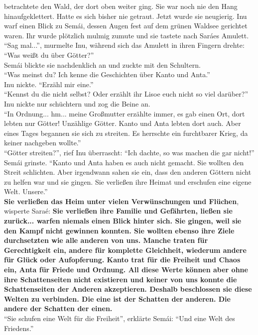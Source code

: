 \documentclass[a4paper,12pt]{book}
\begin{document}
betrachtete den Wald, der dort oben weiter ging. Sie war noch nie den Hang hinaufgeklettert. Hatte 
es sich bisher nie getraut. Jetzt wurde sie neugierig. Inu warf einen Blick zu Semái, dessen Augen 
fest auf dem grünen Waldsee gerichtet waren. 
Ihr wurde plötzlich mulmig zumute und sie tastete nach Saráes Amulett. \\
``Sag mal...'', murmelte Inu, während sich das Amulett in ihren Fingern drehte: ``Was weißt du über 
Götter?''\\
Semái blickte sie nachdenklich an und zuckte mit den Schultern. \\
``Was meinst du? Ich kenne die Geschichten über Kanto und Anta.''\\
Inu nickte. ``Erzähl mir eine.''\\
``Kennst du die nicht selbst?  Oder erzählt ihr Lisoe euch nicht so viel darüber?''\\
Inu nickte nur schüchtern und zog die Beine an. \\
``In Ordnung... hm... meine Großmutter erzählte immer, es gab einen Ort, dort lebten nur Götter! 
Unzählige Götter. Kanto und Anta lebten dort auch. Aber eines Tages begannen sie sich zu streiten. 
Es herrschte ein furchtbarer Krieg, da keiner nachgeben wollte.''\\
``Götter streiten?'', rief Inu überrascht: ``Ich dachte, so was machen die gar nicht!''\\
Semái grinste. ``Kanto und Anta haben es auch nicht gemacht. Sie wollten den Streit schlichten. 
Aber irgendwann sahen sie ein, dass den anderen Göttern nicht zu helfen war und sie gingen. Sie 
verließen ihre Heimat und erschufen eine eigene Welt. Unsere.''\\
\textbf{Sie verließen das Heim unter vielen Verwünschungen und Flüchen}, wisperte Saraé: 
\textbf{Sie verließen ihre Familie und Gefährten, ließen sie zurück... warfen niemals einen Blick 
hinter sich. Sie gingen, weil sie den Kampf nicht gewinnen konnten. Sie wollten ebenso ihre Ziele 
durchsetzten wie alle anderen von uns. Manche traten für Gerechtigkeit ein, andere für komplette 
Gleichheit, wiederum andere für Glück oder Aufopferung. Kanto trat für die Freiheit und Chaos ein, 
Anta für Friede und Ordnung. All diese Werte können aber ohne ihre Schattenseiten nicht existieren 
und keiner von uns konnte die Schattenseiten der Anderen akzeptieren. Deshalb beschlossen sie diese 
Welten zu verbinden. Die eine ist der Schatten der anderen. Die andere der Schatten der einen.}\\
``Sie schufen eine Welt für die Freiheit'', erklärte Semái: ``Und eine Welt des Friedens.''\\
\end{document}

